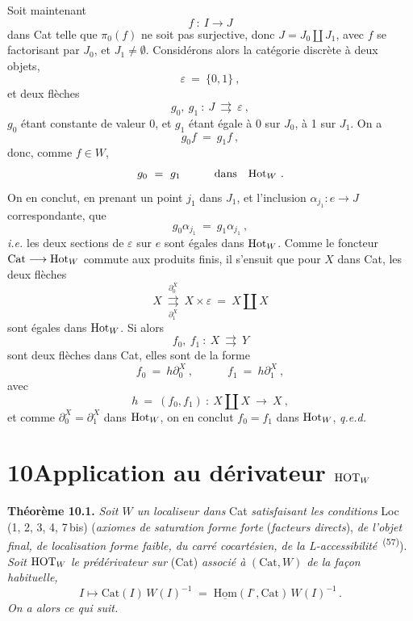Soit maintenant
\[
f\ :\ I\longrightarrow J
\]
dans Cat telle que $\pi_0(f)$ ne soit pas surjective, donc $J=J_0\amalg J_1$, avec $f$ se factorisant par $J_0$, et $J_1\neq\emptyset$. Considérons alors la catégorie discrète à deux objets,
\[
\varepsilon\ =\ \{0,1\}\ ,
\]
et deux flèches
\[
g_0,\ g_1\ :\ J\ \rightrightarrows\ \varepsilon\ ,
\]
$g_0$ étant constante de valeur 0, et $g_1$ étant égale à 0 sur $J_0$, à 1 sur $J_1$. On a
\[
g_0f\ =\ g_1f\ ,
\]
donc, comme $f\in W$,
\[
g_0\ =\ g_1\qquad\quad\text{dans}\quad\Hot_W\ .
\]
On en conclut, en prenant un point $j_1$ dans $J_1$, et l'inclusion $\alpha_{j_1}:e\longrightarrow J$ correspondante, que
\[
g_0\alpha_{j_1}\ =\ g_1\alpha_{j_1}\ ,
\]
\textit{i.e.} les deux sections de $\varepsilon$ sur $e$ sont égales dans $\mathrm{Hot}_W$. Comme le foncteur $\mathrm{Cat}\longrightarrow\mathrm{Hot}_W$ commute aux produits finis, il s'ensuit que pour $X$ dans Cat, les deux flèches
\[
X\ \underset{\partial_1^X}{\overset{\partial_0^X}{\rightrightarrows}}\ X\times\varepsilon\ =\ X\amalg X
\]
sont égales dans $\mathrm{Hot}_W$. Si alors
\[
f_0,\ f_1\ :\ X\ \rightrightarrows\ Y
\]
sont deux flèches dans Cat, elles sont de la forme
\[
f_0\ =\ h\partial_0^X\ ,\qquad\quad f_1\ =\ h\partial_1^X\ ,
\]
avec
\[
h\ =\ (f_0,f_1)\ :\ X\amalg X\ \longrightarrow\ X\ , %
\]
et comme $\partial_0^X=\partial_1^X$ dans $\mathrm{Hot}_W$, on en conclut $f_0=f_1$ dans $\mathrm{Hot}_W$, \quad \textit{q.e.d.}



\section*{10\quad Application au dérivateur $\mathrm{HOT}_W$}

\textbf{Théorème 10.1.} \textit{Soit $W$ un localiseur dans} Cat \textit{satisfaisant les conditions} Loc\,(1, 2, 3, 4, 7\,bis) (\textit{axiomes de saturation forme forte} (\textit{facteurs directs}), \textit{de l'objet final, de localisation forme faible, du carré cocartésien, de la L-accessibilité}~\textsuperscript{(57)}). \textit{Soit} $\mathrm{HOT}_W$ \textit{le prédérivateur sur} (Cat) \textit{associé à} $(\mathrm{Cat}, W)$ \textit{de la façon habituelle,}
\[
I \longmapsto \mathrm{Cat}(I)\,W(I)^{-1} \;=\; \underline{\mathrm{Hom}}(I^{\circ}, \mathrm{Cat})\,W(I)^{-1}\,. \tag*{(10.1.1)}
\]
\textit{On a alors ce qui suit.}


